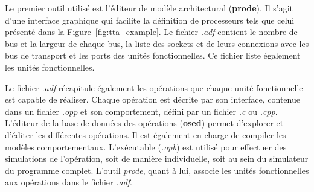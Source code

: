Le premier outil utilisé est l'éditeur de modèle architectural (\textbf{prode}). Il s'agit d'une interface graphique qui facilite la définition de processeurs tels que celui présenté dans la Figure~\ref{fig:tta_example}. Le fichier \textit{.adf} contient le nombre de bus et la largeur de chaque bus, la liste des sockets et de leurs connexions avec les bus de transport et les ports des unités fonctionnelles. Ce fichier liste également les unités fonctionnelles.

Le fichier \textit{.adf} récapitule également les opérations que chaque unité fonctionnelle est capable de réaliser. Chaque opération est décrite par son interface, contenue dans un fichier \textit{.opp} et son comportement, défini par un fichier \textit{.c} ou \textit{.cpp}. L'éditeur de la base de données des opérations (\textbf{osed}) permet d'explorer et d'éditer les différentes opérations. Il est également en charge de compiler les modèles comportementaux. L'exécutable (\textit{.opb}) est utilisé pour effectuer des simulations de l'opération, soit de manière individuelle, soit au sein du simulateur du programme complet. L'outil \textit{prode}, quant à lui, associe les unités fonctionnelles aux opérations dans le fichier \textit{.adf}.

